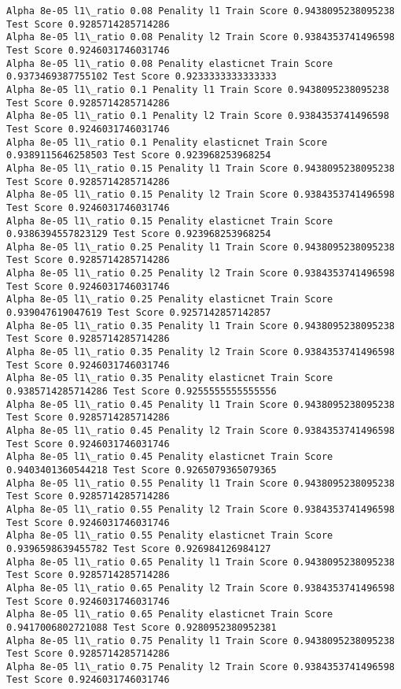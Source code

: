 \documentclass[11pt]{article}
\begin{document}
\begin{Verbatim}[commandchars=\\\{\}]
Alpha 8e-05 l1\_ratio 0.08 Penality l1 Train Score 0.9438095238095238 Test Score 0.9285714285714286
Alpha 8e-05 l1\_ratio 0.08 Penality l2 Train Score 0.9384353741496598 Test Score 0.9246031746031746
Alpha 8e-05 l1\_ratio 0.08 Penality elasticnet Train Score 0.9373469387755102 Test Score 0.9233333333333333
Alpha 8e-05 l1\_ratio 0.1 Penality l1 Train Score 0.9438095238095238 Test Score 0.9285714285714286
Alpha 8e-05 l1\_ratio 0.1 Penality l2 Train Score 0.9384353741496598 Test Score 0.9246031746031746
Alpha 8e-05 l1\_ratio 0.1 Penality elasticnet Train Score 0.9389115646258503 Test Score 0.923968253968254
Alpha 8e-05 l1\_ratio 0.15 Penality l1 Train Score 0.9438095238095238 Test Score 0.9285714285714286
Alpha 8e-05 l1\_ratio 0.15 Penality l2 Train Score 0.9384353741496598 Test Score 0.9246031746031746
Alpha 8e-05 l1\_ratio 0.15 Penality elasticnet Train Score 0.9386394557823129 Test Score 0.923968253968254
Alpha 8e-05 l1\_ratio 0.25 Penality l1 Train Score 0.9438095238095238 Test Score 0.9285714285714286
Alpha 8e-05 l1\_ratio 0.25 Penality l2 Train Score 0.9384353741496598 Test Score 0.9246031746031746
Alpha 8e-05 l1\_ratio 0.25 Penality elasticnet Train Score 0.939047619047619 Test Score 0.9257142857142857
Alpha 8e-05 l1\_ratio 0.35 Penality l1 Train Score 0.9438095238095238 Test Score 0.9285714285714286
Alpha 8e-05 l1\_ratio 0.35 Penality l2 Train Score 0.9384353741496598 Test Score 0.9246031746031746
Alpha 8e-05 l1\_ratio 0.35 Penality elasticnet Train Score 0.9385714285714286 Test Score 0.9255555555555556
Alpha 8e-05 l1\_ratio 0.45 Penality l1 Train Score 0.9438095238095238 Test Score 0.9285714285714286
Alpha 8e-05 l1\_ratio 0.45 Penality l2 Train Score 0.9384353741496598 Test Score 0.9246031746031746
Alpha 8e-05 l1\_ratio 0.45 Penality elasticnet Train Score 0.9403401360544218 Test Score 0.9265079365079365
Alpha 8e-05 l1\_ratio 0.55 Penality l1 Train Score 0.9438095238095238 Test Score 0.9285714285714286
Alpha 8e-05 l1\_ratio 0.55 Penality l2 Train Score 0.9384353741496598 Test Score 0.9246031746031746
Alpha 8e-05 l1\_ratio 0.55 Penality elasticnet Train Score 0.9396598639455782 Test Score 0.926984126984127
Alpha 8e-05 l1\_ratio 0.65 Penality l1 Train Score 0.9438095238095238 Test Score 0.9285714285714286
Alpha 8e-05 l1\_ratio 0.65 Penality l2 Train Score 0.9384353741496598 Test Score 0.9246031746031746
Alpha 8e-05 l1\_ratio 0.65 Penality elasticnet Train Score 0.9417006802721088 Test Score 0.9280952380952381
Alpha 8e-05 l1\_ratio 0.75 Penality l1 Train Score 0.9438095238095238 Test Score 0.9285714285714286
Alpha 8e-05 l1\_ratio 0.75 Penality l2 Train Score 0.9384353741496598 Test Score 0.9246031746031746

\end{Verbatim}
\end{document}
